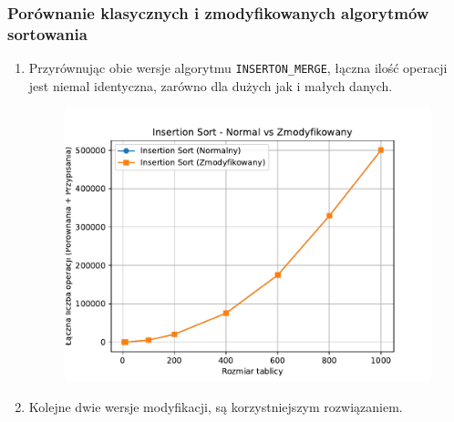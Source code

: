 \documentclass{article}
\begin{document}
\subsubsection*{Porównanie klasycznych i zmodyfikowanych algorytmów sortowania}

\begin{enumerate}
 \item Przyrównując obie wersje algorytmu \texttt{INSERTON\_MERGE}, łączna ilość operacji jest niemal identyczna, zarówno dla dużych jak i małych danych.
  \begin{figure}[H]
 	\centering
 	\includegraphics[width=1\textwidth]{Figure_1.pdf}
 \end{figure}
 \item Kolejne dwie wersje modyfikacji, są korzystniejszym rozwiązaniem.


\end{enumerate}
\end{document}
